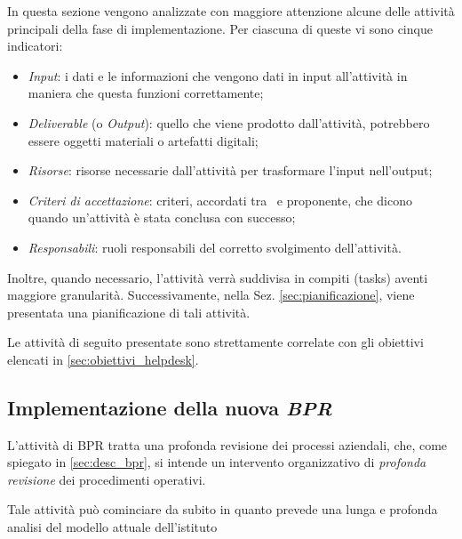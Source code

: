 	In questa sezione vengono analizzate con maggiore attenzione alcune delle attività principali della fase di implementazione.
	Per ciascuna di queste vi sono cinque indicatori:
	\begin{itemize}[noitemsep]
		\renewcommand\labelitemi{--}

		\item \textit{Input}: i dati e le informazioni che vengono dati in input all'attività in maniera che questa funzioni correttamente;

		\item \textit{Deliverable} (o \textit{Output}): quello che viene prodotto dall'attività, potrebbero essere oggetti materiali o artefatti digitali;

		\item \textit{Risorse}: risorse necessarie dall'attività per trasformare l'input nell'output;

		\item \textit{Criteri di accettazione}: criteri, accordati tra \azienda~e proponente, che dicono quando un'attività è stata conclusa con successo; 

		\item \textit{Responsabili}: ruoli responsabili del corretto svolgimento dell'attività.
		
	\end{itemize}

	Inoltre, quando necessario, l'attività verrà suddivisa in compiti (tasks) aventi maggiore granularità.
	Successivamente, nella Sez. \ref{sec:pianificazione}, viene presentata una pianificazione di tali attività.
	
	Le attività di seguito presentate sono strettamente correlate con gli obiettivi elencati in \ref{sec:obiettivi_helpdesk}.
	
	\subsection{Implementazione della nuova \textit{BPR}}\label{subsec:bpr_implmentation}

		L'attività di BPR tratta una profonda revisione dei processi aziendali, che, come spiegato in \ref{sec:desc_bpr}, si intende un intervento organizzativo di \textit{profonda revisione} dei procedimenti operativi.
		
		Tale attività può cominciare da subito in quanto prevede una lunga e profonda analisi del modello attuale dell'istituto
		
